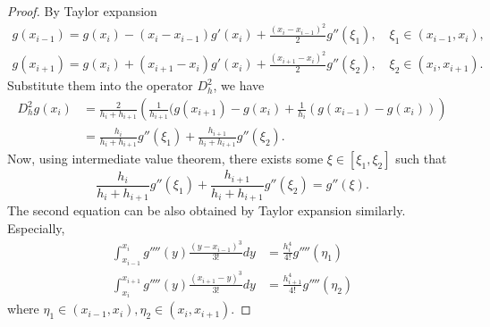 \documentclass{amsart}
\theoremstyle{definition}
\theoremstyle{remark}
\numberwithin{equation}{section}
\begin{document}
\begin{proof}
  By Taylor expansion
  \begin{gather*}
    g(x_{i-1}) = g(x_{i}) - (x_{i}-x_{i-1}) g'(x_{i}) + \frac{(x_{i}-x_{i-1})^2}{2} g''(\xi_1), \quad \xi_1 \in (x_{i-1}, x_{i}),        \\
    g(x_{i+1}) = g(x_{i}) + (x_{i+1}-x_{i}) g'(x_{i}) + \frac{(x_{i+1}-x_{i})^2}{2} g''(\xi_2), \quad \xi_2 \in (x_{i}, x_{i+1}).
  \end{gather*}
  Substitute them into the operator $D_h^2$, we have
  \begin{equation*}
    \begin{aligned}
      D_h^2 g(x_i) & = \frac{2}{h_i + h_{i+1}} \left( \frac{1}{h_{i+1}} (g(x_{i+1})-g(x_i)  + \frac{1}{h_{i}} (g(x_{i-1})-g(x_i)) \right) \\
      &= \frac{h_i}{h_i + h_{i+1}} g''(\xi_1) + \frac{h_{i+1}}{h_i + h_{i+1}} g''(\xi_2)  .
    \end{aligned}
  \end{equation*}
  Now, using intermediate value theorem, there exists some \(\xi \in [\xi_1, \xi_2]\) such that
  \begin{equation*}
    \frac{h_i}{h_i + h_{i+1}} g''(\xi_1) + \frac{h_{i+1}}{h_i + h_{i+1}} g''(\xi_2) = g''(\xi).
  \end{equation*}
  The second equation can be also obtained by Taylor expansion similarly.
  Especially,
  \begin{equation} \label{eq:Dh2Cauchy4}
    \begin{aligned}
      \int_{x_{i-1}}^{x_{i}} g''''(y) \frac{(y-x_{i-1})^3}{3!} dy & = \frac{h_i^4}{4!}g''''(\eta_1) \\
      \int_{x_{i}}^{x_{i+1}} g''''(y) \frac{(x_{i+1}-y)^3}{3!} dy & = \frac{h_{i+1}^4}{4!}g''''(\eta_2)
    \end{aligned}
  \end{equation}
  where \(\eta_1 \in (x_{i-1}, x_{i}), \eta_2 \in (x_{i}, x_{i+1})\).
\end{proof}
\end{document}
